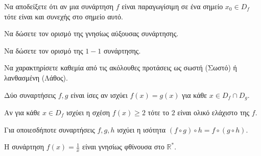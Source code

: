 \begin{thema}
\begin{erwthma}
\item Να αποδείξετε ότι αν μια συνάρτηση $ f $ είναι παραγωγίσιμη σε ένα σημείο $ x_0\in D_f $ τότε είναι και συνεχής στο σημείο αυτό.
\item Να δώσετε τον ορισμό της γνησίως αύξουσας συνάρτησης.
\item Να δώσετε τον ορισμό της $ 1-1 $ συνάρτησης.
\item Να χαρακτηρίσετε καθεμία από τις ακόλουθες προτάσεις ως σωστή (Σωστό) ή λανθασμένη (Λάθος).
\begin{alist}
\item Δύο συναρτήσεις $ f,g $ είναι ίσες αν ισχύει $ f(x)=g(x) $ για κάθε $ x\in D_f\cap D_g $.
\item Αν για κάθε $ x\in D_f $ ισχύει η σχέση $ f(x)\geq 2 $ τότε το $ 2 $ είναι ολικό ελάχιστο της $ f $.
\item 
\item Για οποιεσδήποτε συναρτήσεις $ f,g,h $ ισχύει η ισότητα $ (f\circ g)\circ h=f\circ(g\circ h) $.
\item Η συνάρτηση $ f(x)=\frac{1}{x} $ είναι γνησίως φθίνουσα στο $ \mathbb{R}^* $.
\end{alist}
\end{erwthma}
\end{thema}
